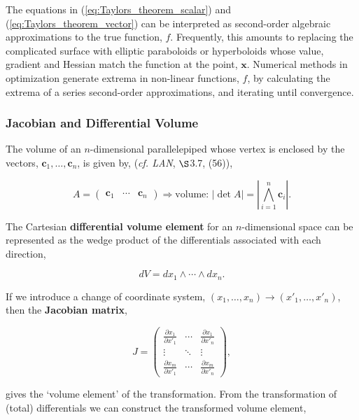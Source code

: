 \documentclass[12pt, twoside, draft]{article}
\begin{document}
The equations in (\ref{eq:Taylors_theorem_scalar}) and (\ref{eq:Taylors_theorem_vector}) can be interpreted as second-order algebraic approximations to the true function, $f$.  Frequently, this amounts to replacing the complicated surface with elliptic paraboloids or hyperboloids whose value, gradient and Hessian match the function at the point, $\mathbf{x}$.  Numerical methods in optimization generate extrema in non-linear functions, $f$, by calculating the extrema of a series second-order approximations, and iterating until convergence.

\subsubsection{Jacobian and Differential Volume}
The volume of an $n$-dimensional parallelepiped whose vertex is enclosed by the vectors, $\mathbf{c}_1, \ldots, \mathbf{c}_n$, is given by, (\textit{cf. LAN}, $\S$3.7, (56)),

\begin{equation}
A = \begin{pmatrix} \mathbf{c}_1 & \cdots & \mathbf{c}_n \end{pmatrix} \Rightarrow \text{volume: } |\det A| = \left| \bigwedge_{i=1}^n \mathbf{c}_i \right|.
\end{equation}

The Cartesian \textbf{differential volume element} for an $n$-dimensional space can be represented as the wedge product of the differentials associated with each direction,

\begin{equation}
dV = dx_1 \wedge \cdots \wedge dx_n.
\end{equation} 

If we introduce a change of coordinate system, $(x_1, \ldots, x_n)  \rightarrow (x'_1, \ldots, x'_n)$, then the \textbf{Jacobian matrix},

\begin{equation}\label{eq:Jacobian}
J = 
\begin{pmatrix}
\frac{\partial x_1}{\partial x'_1} & \cdots & \frac{\partial x_1}{\partial x'_n} \\
\vdots & \ddots & \vdots \\
\frac{\partial x_m}{\partial x'_1} & \cdots & \frac{\partial x_m}{\partial x'_n}
\end{pmatrix},
\end{equation}

gives the `volume element' of the transformation.  From the transformation of (total) differentials we can construct the transformed volume element,
\end{document}
